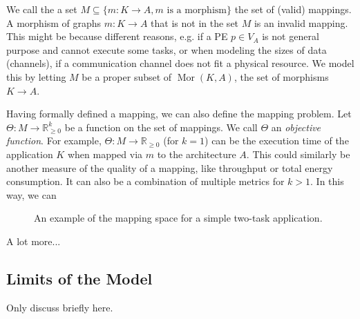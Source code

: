 We call the a set $M \subseteq \{m : K \rightarrow A, m \text{ is a morphism} \}$ the set of (valid) mappings. A morphism of graphs $m : K \rightarrow A$ that is not in the set $M$ is an invalid mapping.
This might be because different reasons, e.g. if a \ac{PE} $p \in V_A$ is not general purpose and cannot execute some tasks, or when modeling the sizes of data (channels), if a communication channel does not fit a physical resource.
We model this by letting $M$ be a proper subset of $\operatorname{Mor}(K,A)$, the set of morphisms $K \rightarrow A$.

Having formally defined a mapping, we can also define the mapping problem. Let $\Theta : M \rightarrow \mathbb{R}_{\geq 0}^k$  be a function on the set of mappings. We call $\Theta$ an \emph{objective function}.
For example, $\Theta: M \rightarrow \mathbb{R}_{\geq 0}$ (for $k = 1$) can be the execution time of the application $K$ when mapped via $m$ to the architecture $A$.
This could similarly be another measure of the quality of a mapping, like throughput or total energy consumption. It can also be a combination of multiple metrics for $k > 1$.
In this way, we can 

\begin{figure}[h]
	\centering
\resizebox{0.8\textwidth}{!}{
   \begin{tikzpicture}
     
   \end{tikzpicture}
 }
   \caption{An example of the mapping space for a simple two-task application.}
   \label{fig:mapping_space_example}
\end{figure}

A lot more...\cite{singh2013mapping} \cite{marwedel2011mapping}

\subsection{Limits of the Model}
Only discuss briefly here.
